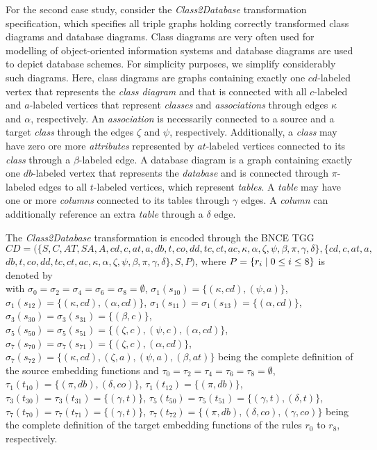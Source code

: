 
For the second case study, consider the \emph{Class2Database} transformation specification, which specifies all triple graphs holding correctly transformed class diagrams and database diagrams. Class diagrams are very often used for modelling of object-oriented information systems and database diagrams are used to depict database schemes. For simplicity purposes, we simplify considerably such diagrams. Here, class diagrams are graphs containing exactly one $cd$-labeled vertex that represents the \emph{class diagram} and that is connected with all $c$-labeled and $a$-labeled vertices that represent \emph{classes} and \emph{associations} through edges $\kappa$ and $\alpha$, respectively. An \emph{association} is necessarily connected to a source and a target \emph{class} through the edges $\zeta$ and $\psi$, respectively. Additionally, a \emph{class} may have zero ore more \emph{attributes} represented by $at$-labeled vertices connected to its \emph{class} through a $\beta$-labeled edge. A database diagram is a graph containing exactly one $db$-labeled vertex that represents the \emph{database} and is connected through $\pi$-labeled edges to all $t$-labeled vertices, which represent \emph{tables}. A \emph{table} may have one or more \emph{columns} connected to its tables through $\gamma$ edges. A \emph{column} can additionally reference an extra \emph{table} through a $\delta$ edge.

The \emph{Class2Database} transformation is encoded through the BNCE TGG $CD = (\{S, C, AT, SA, A, cd, c, at, a, db, t, co, dd, tc, ct, ac, \kappa, \alpha, \zeta, \psi, \beta, \pi, \gamma, \delta\}, \{cd, c, at, a, $ $ db, t, co, dd, tc, ct, ac, \kappa, \alpha, \zeta, \psi, \beta, \pi, \gamma, \delta\}, S, P)$, where $P = \{r_i \; | \; 0 \le i \le 8\}$ is denoted by\\


\noindent
with $\sigma_0 = \sigma_2 = \sigma_4 = \sigma_6 = \sigma_8 = \emptyset$, $\sigma_1(s_{10}) = \{(\kappa,cd),(\psi,a)\}$, $\sigma_1(s_{12}) = \{(\kappa,cd),(\alpha, cd)\}$, $\sigma_1(s_{11}) = \sigma_1(s_{13}) =\{(\alpha, cd)\}$, $\sigma_3(s_{30}) = \sigma_3(s_{31}) = \{(\beta,c)\}$, $\sigma_5(s_{50}) = \sigma_5(s_{51}) = \{(\zeta,c),(\psi,c),(\alpha,cd)\}$, $\sigma_7(s_{70}) = \sigma_7(s_{71}) = \{(\zeta,c),(\alpha,cd)\}$, $\sigma_7(s_{72}) = \{(\kappa,cd),(\zeta,a),(\psi,a),(\beta,at)\}$ being the complete definition of the source embedding functions and $\tau_0 = \tau_2 = \tau_4 = \tau_6 = \tau_8 = \emptyset$, $\tau_1(t_{10}) = \{(\pi,db),(\delta,co)\}$, $\tau_1(t_{12}) = \{(\pi,db)\}$, $\tau_3(t_{30}) = \tau_3(t_{31}) = \{(\gamma,t)\}$, $\tau_5(t_{50}) = \tau_5(t_{51}) = \{(\gamma,t),(\delta,t)\}$, $\tau_7(t_{70}) = \tau_7(t_{71}) = \{(\gamma,t)\}$, $\tau_7(t_{72}) = \{(\pi,db),(\delta,co),(\gamma,co)\}$ being the complete definition of the target embedding functions of the rules $r_0$ to $r_8$, respectively.

